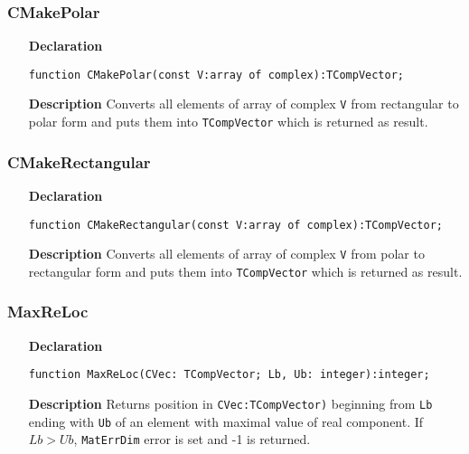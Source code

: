 \documentclass[12pt,a4paper,oneside]{report}
\newcommand{\declarationitem}[1]{\textbf{#1}}
\newcommand{\descriptiontitle}[1]{\textbf{#1}}
\newcommand{\code}[1]{\texttt{#1}}
\begin{document}
\subsubsection{CMakePolar}
\label{cmakepolar}
\begin{itemize}
	\item[\declarationitem{Declaration}\hfill]
	\begin{flushleft}
\code{function CMakePolar(const V:array of complex):TCompVector;}
	\end{flushleft}
	\item[\descriptiontitle{Description}]
Converts all elements of array of complex \code{V} from rectangular to polar form and puts them into \code{TCompVector} which is returned as result.	
\end{itemize}	
\subsubsection{CMakeRectangular}
\label{cmakerectangular}
\begin{itemize}
	\item[\declarationitem{Declaration}\hfill]
	\begin{flushleft}
		\code{function CMakeRectangular(const V:array of complex):TCompVector;}
	\end{flushleft}
	\item[\descriptiontitle{Description}]
	Converts all elements of array of complex \code{V} from polar to rectangular form and puts them into \code{TCompVector} which is returned as result.	
\end{itemize}	
\subsubsection{MaxReLoc}
\label{maxreloc}
\begin{itemize}
	\item[\declarationitem{Declaration}\hfill]
	\begin{flushleft}
\code{function MaxReLoc(CVec: TCompVector; Lb, Ub: integer):integer;}		
	\end{flushleft}
	\item[\descriptiontitle{Description}]
	Returns position in \code{CVec:TCompVector)} beginning from \code{Lb} ending with \code{Ub} of an element with maximal value of real component. If $Lb > Ub$, \code{MatErrDim} error is set and -1 is returned.  
\end{itemize}	
\end{document}
